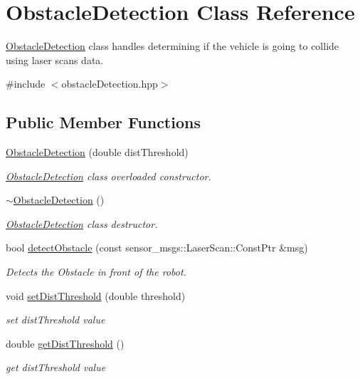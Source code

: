 \hypertarget{classObstacleDetection}{}\section{Obstacle\+Detection Class Reference}
\label{classObstacleDetection}


\hyperlink{classObstacleDetection}{Obstacle\+Detection} class handles determining if the vehicle is going to collide using laser scans data.  




{\ttfamily \#include $<$obstacle\+Detection.\+hpp$>$}

\subsection*{Public Member Functions}
\begin{DoxyCompactItemize}
\item 
\hyperlink{classObstacleDetection_afb1806d3b8806f9d269bc29b8e8c6ac9}{Obstacle\+Detection} (double dist\+Threshold)
\begin{DoxyCompactList}\small\item\em \hyperlink{classObstacleDetection}{Obstacle\+Detection} class overloaded constructor. \end{DoxyCompactList}\item 
\hyperlink{classObstacleDetection_a72cb5fb0b56c1c3b6e4ab42da46e28e9}{$\sim$\+Obstacle\+Detection} ()
\begin{DoxyCompactList}\small\item\em \hyperlink{classObstacleDetection}{Obstacle\+Detection} class destructor. \end{DoxyCompactList}\item 
bool \hyperlink{classObstacleDetection_a99de70aa28dfaa9f1c2770e3d744a4cc}{detect\+Obstacle} (const sensor\+\_\+msgs\+::\+Laser\+Scan\+::\+Const\+Ptr \&msg)
\begin{DoxyCompactList}\small\item\em Detects the Obstacle in front of the robot. \end{DoxyCompactList}\item 
void \hyperlink{classObstacleDetection_a7168393889737f1798acafa452a6a69a}{set\+Dist\+Threshold} (double threshold)
\begin{DoxyCompactList}\small\item\em set dist\+Threshold value \end{DoxyCompactList}\item 
double \hyperlink{classObstacleDetection_aae290781954d75c8e90517e6ac39c7d1}{get\+Dist\+Threshold} ()
\begin{DoxyCompactList}\small\item\em get dist\+Threshold value \end{DoxyCompactList}\end{DoxyCompactItemize}
